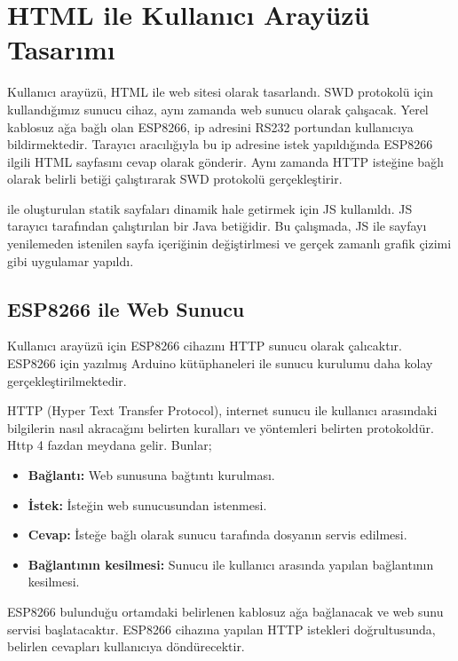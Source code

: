 \chapter{HTML ile Kullanıcı Arayüzü Tasarımı}

Kullanıcı arayüzü, \acrshort{HTML} ile web sitesi olarak tasarlandı. SWD protokolü için kullandığımız sunucu cihaz, aynı zamanda web sunucu olarak çalışacak. Yerel kablosuz ağa bağlı olan ESP8266, ip adresini RS232 portundan kullanıcıya bildirmektedir. Tarayıcı aracılığıyla bu ip adresine istek yapıldığında ESP8266 ilgili HTML sayfasını cevap olarak gönderir. Aynı zamanda HTTP isteğine bağlı olarak belirli betiği çalıştırarak SWD protokolü gerçekleştirir.

 ile oluşturulan statik sayfaları dinamik hale getirmek için \acrfull{JS} kullanıldı. JS tarayıcı tarafından çalıştırılan bir Java betiğidir. Bu çalışmada, JS ile sayfayı yenilemeden istenilen sayfa içeriğinin değiştirlmesi ve gerçek zamanlı grafik çizimi gibi uygulamar yapıldı.



\section{ESP8266 ile Web Sunucu}

Kullanıcı arayüzü için ESP8266 cihazını HTTP sunucu olarak çalıcaktır. ESP8266 için yazılmış Arduino kütüphaneleri ile sunucu kurulumu daha kolay gerçekleştirilmektedir.

HTTP (Hyper Text Transfer Protocol), internet sunucu ile kullanıcı arasındaki bilgilerin nasıl akracağını belirten kuralları ve yöntemleri belirten protokoldür. Http 4 fazdan meydana gelir. Bunlar;

\begin{itemize}
	\item \textbf{Bağlantı:} Web sunusuna bağtıntı kurulması.
	\item \textbf{İstek:} İsteğin web sunucusundan istenmesi.
	\item \textbf{Cevap:} İsteğe bağlı olarak sunucu tarafında dosyanın servis edilmesi.
	\item \textbf{Bağlantının kesilmesi:} Sunucu ile kullanıcı arasında yapılan bağlantının kesilmesi.
\end{itemize}

ESP8266 bulunduğu ortamdaki belirlenen kablosuz ağa bağlanacak ve web sunu servisi başlatacaktır. ESP8266 cihazına yapılan HTTP istekleri doğrultusunda, belirlen cevapları kullanıcıya döndürecektir.

